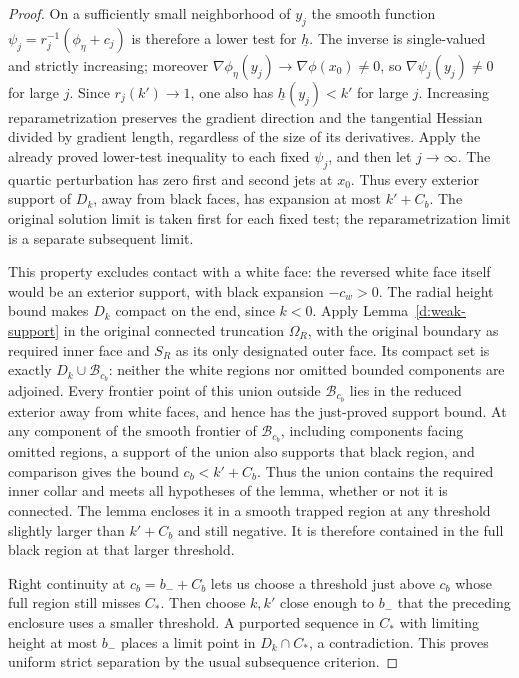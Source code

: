 \begin{proof}
On a sufficiently small neighborhood of $y_j$ the smooth function
$\psi_j=r_j^{-1}(\phi_\eta+c_j)$ is therefore a lower test for
$\underline h$.  The inverse is single-valued and strictly
increasing; moreover $\nabla\phi_\eta(y_j)\to\nabla\phi(x_0)\ne0$,
so $\nabla\psi_j(y_j)\ne0$ for large $j$.  Since $r_j(k')\to1$,
one also has $\underline h(y_j)<k'$ for large $j$.
Increasing reparametrization preserves the gradient direction and
the tangential Hessian divided by gradient length, regardless of
the size of its derivatives.  Apply the already proved lower-test
inequality to each fixed $\psi_j$, and then let $j\to\infty$.
The quartic perturbation has zero first and second jets at $x_0$.
Thus every exterior support of $D_k$, away from black faces, has
expansion at most $k'+C_b$.  The original solution limit is taken
first for each fixed test; the reparametrization limit is a separate
subsequent limit.

This property excludes contact with a white face: the reversed
white face itself would be an exterior support, with black
expansion $-c_w>0$.  The radial height bound makes $D_k$ compact on
the end, since $k<0$.  Apply Lemma~\ref{d:weak-support} in the
original connected truncation $\Omega_R$, with the original
boundary as required inner face and $S_R$ as its only designated
outer face.  Its compact set is exactly
$D_k\cup\mathcal B_{c_b}$: neither the white regions nor omitted
bounded components are adjoined.  Every frontier point of this
union outside $\mathcal B_{c_b}$ lies in the reduced exterior
away from white faces, and hence has the just-proved support bound.
At any component of the smooth frontier of $\mathcal B_{c_b}$,
including components facing omitted regions, a support of the
union also supports that black region, and comparison gives the
bound $c_b<k'+C_b$.  Thus the union contains the required inner
collar and meets all hypotheses of the lemma, whether or not it
is connected.  The lemma encloses it in a
smooth trapped region at any threshold slightly larger than
$k'+C_b$ and still negative.  It is therefore contained in the full
black region at that larger threshold.

Right continuity at $c_b=b_-+C_b$ lets us choose a threshold just
above $c_b$ whose full region still misses $C_*$.  Then choose
$k,k'$ close enough to $b_-$ that the preceding enclosure uses a
smaller threshold.  A purported sequence in $C_*$ with limiting
height at most $b_-$ places a limit point in $D_k\cap C_*$, a
contradiction.  This proves uniform strict separation by the usual
subsequence criterion.


\end{proof}
